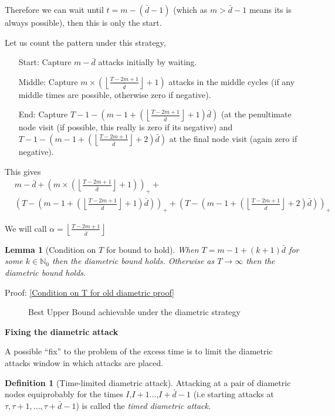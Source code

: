 \documentclass[a4paper,10pt]{article}
\newcommand{\floor}[1]{\left \lfloor #1 \right \rfloor}
\newcommand{\pospart}[1]{\left( #1 \right)_{+}}
\newtheorem{lemma}[theorem]{Lemma}
\theoremstyle{definition}
\newtheorem{definition}[theorem]{Definition}
\theoremstyle{definition}
\theoremstyle{remark}
\theoremstyle{definition}
\begin{document}
Therefore we can wait until $t=m-(\bar{d}-1)$ (which as $m > \bar{d}-1$ means its is always possible), then this is only the start.

Let us count the pattern under this strategy,
\begin{itemize}
\item[Start:] Capture $m-\bar{d}$ attacks initially by waiting.
\item[Middle:] Capture $m \times (\floor{\frac{T-2m+1}{\bar{d}}}+1)$ attacks in the middle cycles (if any middle times are possible, otherwise zero if negative).
\item[End:] Capture $T-1-(m-1+(\floor{\frac{T-2m+1}{\bar{d}}}+1)\bar{d})$ (at the penultimate node visit (if possible, this really is zero if its negative) and $T-1-(m-1+(\floor{\frac{T-2m+1}{\bar{d}}}+2)\bar{d})$ at the final node visit (again zero if negative).
\end{itemize}

This gives \begin{align*}
& m-\bar{d}+\pospart{m \times (\floor{\frac{T-2m+1}{\bar{d}}}+1)} + \\ &\pospart{T-(m-1+(\floor{\frac{T-2m+1}{\bar{d}}}+1)\bar{d})} + \pospart{T-(m-1+(\floor{\frac{T-2m+1}{\bar{d}}}+2)\bar{d})}
\end{align*}

We will call $\alpha=\floor{\frac{T-2m+1}{\bar{d}}}$

\begin{lemma}[Condition on $T$ for bound to hold]
When $T=m-1+(k+1)\bar{d}$ for some $k \in \mathbb{N}_{0}$ then the diametric bound holds. Otherwise as $T \rightarrow \infty$ then the diametric bound holds.
\end{lemma}

Proof: \ref{Condition on T for old diametric proof}

\begin{figure}
\resizebox{0.95\linewidth}{!}{
}
\caption{Best Upper Bound achievable under the diametric strategy}
\end{figure}

\textbf{Fixing the diametric attack}

A possible ``fix'' to the problem of the excess time is to limit the diametric attacks window in which attacks are placed.

\begin{definition}[Time-limited diametric attack]
Attacking at a pair of diametric nodes equiprobably for the times $I$,$I+1$...,$I+\bar{d}-1$ (i.e starting attacks at $\tau,\tau+1,...,\tau+\bar{d}-1$) is called the \textit{timed diametric attack}.
\end{definition}
\end{document}

